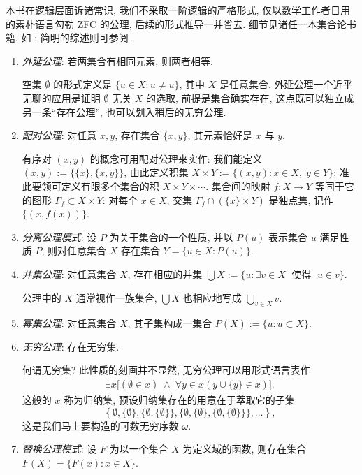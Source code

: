 本书在逻辑层面诉诸常识, 我们不采取一阶逻辑的严格形式, 仅以数学工作者日用的素朴语言勾勒 ZFC 的公理, 后续的形式推导一并省去. 细节见诸任一本集合论书籍, 如 \cite{Je03,HY14}; 简明的综述则可参阅 \cite{sep-set-theory}.
\begin{enumerate}[\bfseries {A}.1]
	\item \emph{外延公理}: 若两集合有相同元素, 则两者相等.

		空集 $\emptyset$ 的形式定义是 $\{u \in X: u \neq u\}$, 其中 $X$ 是任意集合. 外延公理一个近乎无聊的应用是证明 $\emptyset$ 无关 $X$ 的选取, 前提是集合确实存在, 这点既可以独立成另一条``存在公理'', 也可以划入稍后的无穷公理.
	\item \emph{配对公理}: 对任意 $x,y$, 存在集合 $\{x,y\}$, 其元素恰好是 $x$ 与 $y$.
	
		有序对 $(x,y)$ 的概念可用配对公理来实作: 我们能定义 $(x,y) := \{\{x\}, \{x,y\} \}$, 由此定义积集 $X \times Y := \{(x,y) : x \in X,\; y \in Y \}$; 准此要领可定义有限多个集合的积 $X \times Y \times \cdots$. 集合间的映射 $f: X \to Y$ 等同于它的图形 $\Gamma_f \subset X \times Y$: 对每个 $x \in X$, 交集 $\Gamma_f \cap (\{x\} \times Y)$ 是独点集, 记作 $\{(x, f(x))\}$.
	\item \emph{分离公理模式}: 设 $P$ 为关于集合的一个性质, 并以 $P(u)$ 表示集合 $u$ 满足性质 $P$, 则对任意集合 $X$ 存在集合 $Y = \{u \in X : P(u) \}$.
	\item \emph{并集公理}:  对任意集合 $X$, 存在相应的并集 $\bigcup X := \{u : \exists v \in X \; \text{ 使得 }\; u \in v\}$.
	
		公理中的 $X$ 通常视作一族集合, $\bigcup X$ 也相应地写成 $\bigcup_{v \in X} v$.
	\item \emph{幂集公理}: 对任意集合 $X$, 其子集构成一集合 $P(X) := \{u : u \subset X \}$.
	\item \emph{无穷公理}: 存在无穷集.

		何谓无穷集? 此性质的刻画并不显然, 无穷公理可以用形式语言表作
		\begin{gather}\label{eqn:infinity-axiom}
			\exists x \bigl[ (\emptyset \in x) \;\wedge \;\forall y \in x \left(y \cup \{y\} \in x \right)  \bigr].
		\end{gather}
		这般的 $x$ 称为归纳集, 预设归纳集存在的用意在于萃取它的子集
		\[ \left\{\emptyset, \{\emptyset\}, \{  \emptyset, \{\emptyset\}\}, \{  \emptyset, \{\emptyset\}, \{  \emptyset, \{\emptyset\}\}\}, \ldots \right\}, \]
		这是我们马上要构造的可数无穷序数 $\omega$.
	\item \emph{替换公理模式}: 设 $F$ 为以一个集合 $X$ 为定义域的函数, 则存在集合 $F(X) = \{ F(x) : x \in X\}$.
	

\end{enumerate}
